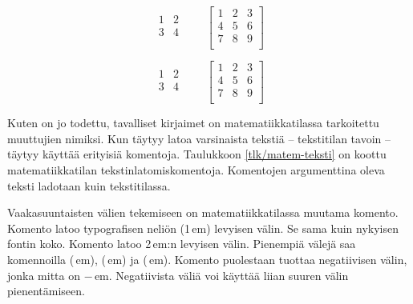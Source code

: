 \begin{koodilohkosis}
\[ \begin{matrix} 1 & 2 \\ 3 & 4 \\ \end{matrix} \qquad
   \begin{bmatrix}
     1 & 2 & 3 \\ 4 & 5 & 6 \\ 7 & 8 & 9 \\
   \end{bmatrix} \]
\end{koodilohkosis}
\[ \begin{matrix} 1 & 2 \\ 3 & 4 \\ \end{matrix} \qquad
  \begin{bmatrix}
    1 & 2 & 3 \\ 4 & 5 & 6 \\ 7 & 8 & 9 \\
  \end{bmatrix} \]


\noindent
Kuten on jo todettu, tavalliset kirjaimet on matematiikkatilassa
tarkoitettu muuttujien nimiksi. Kun täytyy latoa varsinaista tekstiä --
tekstitilan tavoin -- täytyy käyttää erityisiä komentoja. Taulukkoon
\ref{tlk/matem-teksti} on koottu matematiikkatilan
tekstinlatomiskomentoja. Komentojen argumenttina oleva teksti ladotaan
kuin tekstitilassa.

Vaakasuuntaisten välien tekemiseen on matematiikkatilassa muutama
komento. Komento  latoo typografisen neliön (1\,em)
levyisen välin. Se sama kuin nykyisen fontin koko. Komento
 latoo 2\,em:n levyisen välin. Pienempiä välejä saa
komennoilla \mkomento{,} (\,em), \mkomento{:}
(\,em) ja \mkomento{;} (\,em). Komento
\mkomento{!} puolestaan tuottaa negatiivisen välin, jonka mitta on
−\,em. Negatiivista väliä voi käyttää liian suuren
välin pienentämiseen.


